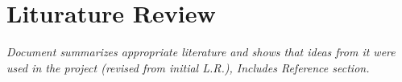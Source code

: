 \section{Liturature Review}
\textit{Document summarizes appropriate literature and shows that ideas from it were used in the project (revised from initial L.R.), Includes Reference section. 
}